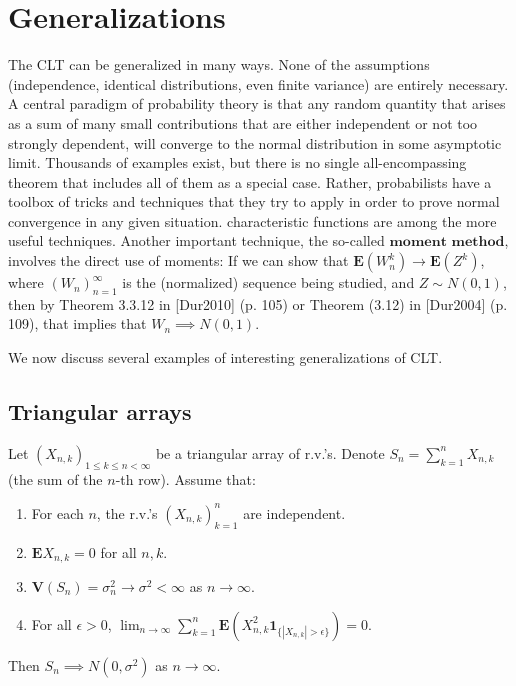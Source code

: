 \section{Generalizations}

The CLT can be generalized in many ways. None of the
assumptions (independence, identical distributions,
even finite variance) are entirely necessary. A
central paradigm of probability theory is that any
random quantity that arises as a sum of many small
contributions that are either independent or not too
strongly dependent, will converge to the normal
distribution in some asymptotic limit. Thousands of
examples exist, but there is no single
all-encompassing theorem that includes all of them as
a special case. Rather, probabilists have a toolbox of
tricks and techniques that they try to apply in order
to prove normal convergence in any given situation.
characteristic functions are among the more useful
techniques. Another important technique, the so-called
$\textbf{moment method}$, involves the direct use of
moments: If we can show that
$\mathbf{E}(W_n^k)\to \mathbf{E}(Z^k)$, where
$(W_n)_{n=1}^\infty$ is the (normalized) sequence
being studied, and $Z\sim N(0,1)$, then by Theorem
3.3.12 in [Dur2010] (p. 105) or Theorem (3.12) in
[Dur2004] (p. 109), that implies that
$W_n\implies N(0,1)$.

We now discuss several examples of interesting
generalizations of CLT.

\subsection{Triangular arrays}

\begin{thm}
\label{thm-lindeberg-feller}
Let $(X_{n,k})_{1\le k\le n<\infty}$ be a triangular
array of r.v.'s. Denote $S_n = \sum_{k=1}^n X_{n,k}$
(the sum of the $n$-th row). Assume that:

\begin{enumerate}[label=\arabic*.]
\item For each $n$, the r.v.'s $(X_{n,k})_{k=1}^n$ are
independent.

\item $\mathbf{E} X_{n,k}=0$ for all $n,k$.

\item $\mathbf{V}(S_n) = \sigma_n^2 \to \sigma^2<\infty$ as
$n\to\infty$.

\item For all $\epsilon>0$,
${\displaystyle \lim_{n\to\infty}} \sum_{k=1}^n
\mathbf{E}\left( X_{n,k}^2
\mathbf{1}_{\{|X_{n,k}|>\epsilon\}}\right)=0$.
\end{enumerate}

\noindent Then $S_n \implies N(0,\sigma^2)$ as $n\to\infty$.
\end{thm}

